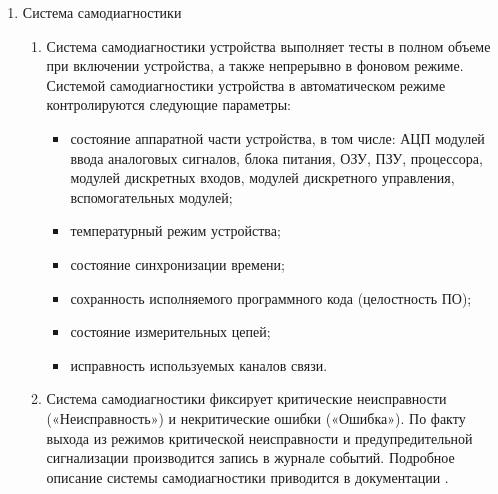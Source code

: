 \begin{enumerate}[label=\arabic{section}.\arabic{subsection}.\arabic*, labelsep=4pt, leftmargin=0pt, itemindent=57pt]
\begin{enumerate}[label=\arabic{section}.\arabic{subsection}.\arabic{enumi}.\arabic*, labelsep=4pt, leftmargin=0em, itemindent=65pt, parsep=0pt]
\item
Устройство предусматривает возможность синхронизации внутренних часов реального времени несколькими способами:
\begin{itemize}
\item по протоколу SNTP;
\item по протоколу PTP;
\item через дискретный вход устройства с использованием сигнала синхронизации 1PPS;
\item {средствами стандартизованного протокола передачи данных.}
\end{itemize}
Подробное описание способов синхронизации времени устройства приведено в документации \ManualUnitGeneral.

\end{enumerate}

\item Система самодиагностики
\begin{enumerate}[label=\arabic{section}.\arabic{subsection}.\arabic{enumi}.\arabic*, labelsep=4pt, leftmargin=0em, itemindent=65pt, parsep=0pt]

\item
Система самодиагностики устройства выполняет тесты в полном объеме при включении устройства, а также непрерывно в фоновом режиме.
Системой самодиагностики устройства в автоматическом режиме контролируются следующие параметры:
\begin{itemize}
\item состояние аппаратной части устройства, в том числе: АЦП модулей ввода аналоговых сигналов, блока питания, ОЗУ, ПЗУ, процессора, модулей дискретных входов, модулей дискретного управления, вспомогательных модулей;
\item температурный режим устройства;
\item состояние синхронизации времени;
\item сохранность исполняемого программного кода (целостность ПО);
\item состояние измерительных цепей;
\item исправность используемых каналов связи.
\end{itemize}

\item
Система самодиагностики фиксирует критические неисправности («Неисправность») и некритические ошибки («Ошибка»).
По факту выхода из режимов критической неисправности и предупредительной сигнализации производится запись в журнале событий.
Подробное описание системы самодиагностики приводится в документации \ManualUnitGeneral.


\end{enumerate}
\end{enumerate}
